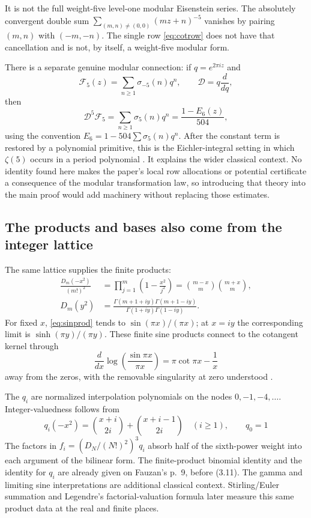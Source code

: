 \documentclass[11pt]{article}
\theoremstyle{definition}
\theoremstyle{remark}\newtheorem*{remark}{Remark}
\begin{document}
It is not the full weight-five level-one modular Eisenstein series.
The absolutely convergent double sum
$\sum_{(m,n)\ne(0,0)}(mz+n)^{-5}$ vanishes by pairing $(m,n)$ with $(-m,-n)$.
The single row \eqref{eq:cotrow} does not have that cancellation and is not, by
itself, a weight-five modular form.

There is a separate genuine modular connection: if $q=e^{2\pi iz}$ and
\[
 \mathcal F_5(z)=\sum_{n\ge1}\sigma_{-5}(n)q^n,
 \qquad \mathcal D=q\frac d{dq},
\]
then
\[
 \mathcal D^5\mathcal F_5=\sum_{n\ge1}\sigma_5(n)q^n
 =\frac{1-E_6(z)}{504},
\]
using the convention $E_6=1-504\sum\sigma_5(n)q^n$.
After the constant term is restored by a polynomial primitive, this is the
Eichler-integral setting in which $\zeta(5)$ occurs in a period polynomial
\cite{Ramanujan}. It explains the wider classical context. No identity found
here makes the paper's local row allocations or potential certificate a
consequence of the modular transformation law, so introducing that theory into
the main proof would add machinery without replacing those estimates.

\subsection{The products and bases also come from the integer lattice}
The same lattice supplies the finite products:
\begin{align}
 \frac{D_m(-x^2)}{(m!)^2}
 &=\prod_{j=1}^m\left(1-\frac{x^2}{j^2}\right)
 =\binom{m-x}{m}\binom{m+x}{m},\label{eq:sinprod}\\
 D_m(y^2)&=
 \frac{\Gamma(m+1+iy)\Gamma(m+1-iy)}
      {\Gamma(1+iy)\Gamma(1-iy)}.\label{eq:gammaprod}
\end{align}
For fixed $x$, \eqref{eq:sinprod} tends to $\sin(\pi x)/(\pi x)$;
at $x=iy$ the corresponding limit is $\sinh(\pi y)/(\pi y)$.
These finite sine products connect to the cotangent kernel through
\[
 \frac d{dx}\log\!\left(\frac{\sin\pi x}{\pi x}\right)
 =\pi\cot\pi x-\frac1x
\]
away from the zeros, with the removable singularity at zero understood
\cite{Cotangent,Gamma}.

The $q_i$ are normalized interpolation polynomials on the nodes
$0,-1,-4,\ldots$. Integer-valuedness follows from
\[
 q_i(-x^2)=\binom{x+i}{2i}+\binom{x+i-1}{2i}\quad(i\ge1),
 \qquad q_0=1
\]
The factors in $f_i=(D_N/(N!)^2)^3q_i$ absorb half
of the sixth-power weight into each argument of the bilinear form.
The finite-product binomial identity and the identity for $q_i$ are already
given on Fauzan's p.~9, before (3.11). The gamma and limiting sine
interpretations are additional classical context.
Stirling/Euler summation and Legendre's factorial-valuation formula later
measure this same product data at the real and finite places.
\end{document}
